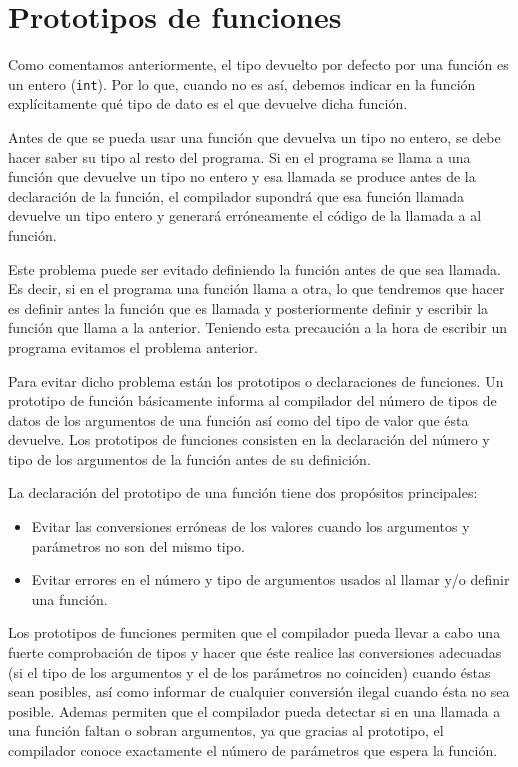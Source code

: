 \section{Prototipos de funciones}
Como comentamos anteriormente, el tipo devuelto por defecto por una función es un entero (\texttt{int}). Por lo que, cuando no es así, debemos indicar en la función explícitamente qué tipo de dato es el que devuelve dicha función.

Antes de que se pueda usar una función que devuelva un tipo no entero, se debe hacer saber su tipo al resto del programa. Si en el programa se llama a una función que devuelve un tipo no entero y esa llamada se produce antes de la declaración de la función, el compilador supondrá que esa función llamada devuelve un tipo entero y generará erróneamente el código de la llamada a al función.

Este problema puede ser evitado definiendo la función antes de que sea llamada. Es decir, si en el programa una función llama a otra, lo que tendremos que hacer es definir antes la función que es llamada y posteriormente definir y escribir la función que llama a la anterior. Teniendo esta precaución a la hora de escribir un programa evitamos el problema anterior.

Para evitar dicho problema están los prototipos o declaraciones de funciones. Un prototipo de función básicamente informa al compilador del número de tipos de datos de los argumentos de una función así como del tipo de valor que ésta devuelve. Los prototipos de funciones consisten en la declaración del número y tipo de los argumentos de la función antes de su definición.

La declaración del prototipo de una función tiene dos propósitos principales:
\begin{itemize}
	\item Evitar las conversiones erróneas de los valores cuando los argumentos y parámetros no son del mismo tipo.
	\item Evitar errores en el número y tipo de argumentos usados al llamar y/o definir una función.
\end{itemize}
Los prototipos de funciones permiten que el compilador pueda llevar a cabo una fuerte comprobación de tipos y hacer que éste realice las conversiones adecuadas (si el tipo de los argumentos y el de los parámetros no coinciden) cuando éstas sean posibles, así como informar de cualquier conversión ilegal cuando ésta no sea posible. Ademas permiten que el compilador pueda detectar si en una llamada a una función faltan o sobran argumentos, ya que gracias al prototipo, el compilador conoce exactamente el número de parámetros que espera la función.

